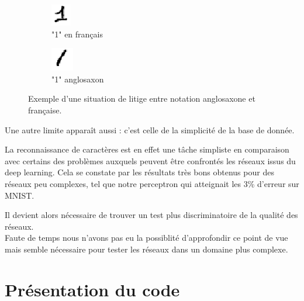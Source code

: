 \documentclass[a4paper,oneside]{report}
\begin{document}
                \begin{figure}
                    \centering
                    \begin{subfigure}[b]{0.3\textwidth}
                        \centering
                        \includegraphics{Images/mnist-02.png}
                        \caption{"1" en français}
                    \end{subfigure}
                    \hfill
                    \begin{subfigure}[b]{0.3\textwidth}
                        \centering
                        \includegraphics{Images/mnist-03.png}
                        \caption{"1" anglosaxon}
                    \end{subfigure}
                    \caption{Exemple d'une situation de litige entre notation anglosaxone et française.}
                \end{figure}

                Une autre limite apparaît aussi : c'est celle de la simplicité de la base de donnée.

                La reconnaissance de caractères est en effet une tâche simpliste en comparaison avec certains des problèmes auxquels peuvent être confrontés les réseaux issus du deep learning. Cela se constate par les résultats très bons obtenus pour des réseaux peu complexes, tel que notre perceptron qui atteignait les 3\% d'erreur sur MNIST.

                Il devient alors nécessaire de trouver un test plus discriminatoire de la qualité des réseaux.\\

                Faute de temps nous n'avons pas eu la possiblité d'approfondir ce point de vue mais semble nécessaire pour tester les réseaux dans un domaine plus complexe.

        \chapter{Présentation du code}
\end{document}
